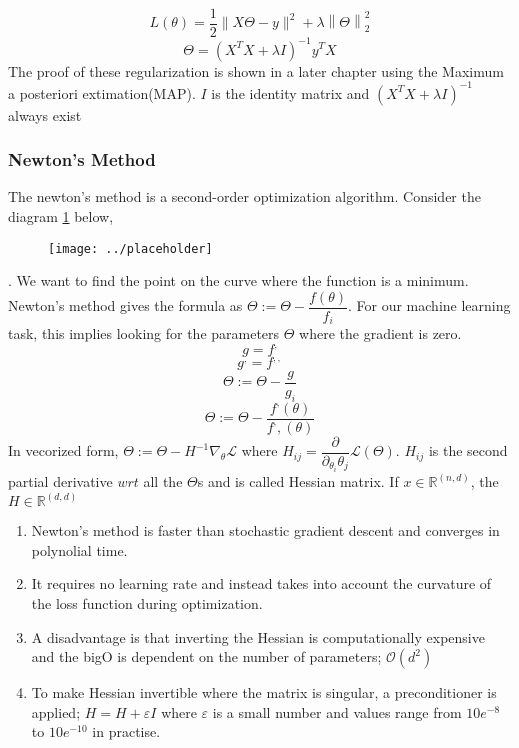\documentclass[12pt,a4paper,titlepage,landscape]{book}
\begin{document}
	
	\begin{equation}
	L(\theta) = \dfrac{1}{2}\|X\Theta - y\|^2 + \lambda\left\|\Theta\right\|_2^2
	\end{equation}
	\begin{equation}
		\Theta = \left(X^TX + \lambda{I}\right)^{-1}y^TX
	\end{equation}
	The proof of these regularization is shown in a later chapter using the Maximum a posteriori extimation(MAP). $I$ is the identity matrix and $\left(X^TX + \lambda{I}\right)^{-1}$ always exist
	
	\subsubsection{Newton's Method}
	The newton's method is a second-order optimization algorithm.
	Consider the diagram \ref{fig:newton} below,  
	
	\begin{figure}
		\centering
		\texttt{[image: ../placeholder]}
		\caption{}
		\label{fig:newton}
	\end{figure}.
	We want to find the point on the curve where the function is a minimum. Newton's method gives the formula as $\Theta := \Theta - \dfrac{f(\theta)}{f_i}$. For our machine learning task, this implies looking for the parameters $\Theta$ where the gradient is zero. 
	$$g = f^,$$ $$g^, = f^{,,}$$
	$$\Theta := \Theta - \dfrac{g}{g_i}$$
	$$\Theta := \Theta - \dfrac{f^,(\theta)}{f^,,(\theta)}$$
	In vecorized form, $\Theta := \Theta - H^{-1}\nabla_\theta\mathcal{L}$ where $H_{ij} = \dfrac{\partial}{\partial_{\theta_i}\theta_j}\mathcal{L}(\Theta)$. $H_{ij}$ is the second partial derivative $wrt$ all the $\Theta$s and is called Hessian matrix. If $x \in \mathbb{R}^{(n, d)}$, the $H \in \mathbb{R}^{(d, d)} $ \\
	
	\begin{enumerate}
		\item Newton's method is faster than stochastic gradient descent and converges in polynolial time.
		\item It requires no learning rate and instead takes into account the curvature of the loss function during optimization.
		\item A disadvantage is that inverting the Hessian is computationally expensive and the bigO is dependent on the number of parameters; $\mathcal{O}(d^2)$ 
		\item To make Hessian invertible where the matrix is singular, a preconditioner is applied; $H = H + \varepsilon{I}$ where $\varepsilon$ is a small number and values range from $10e^{-8}$ to $10e^{-10}$ in practise.
	
	\end{enumerate}
\end{document}
